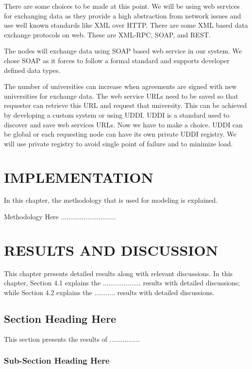 \documentclass[12pt,a4paper,oneside]{book} %
\begin{document}
There are some choices to be made at this point. We will be using web services for exchanging data as they provide a high abstraction from network issues and use well known standards like XML over HTTP. There are some XML based data exchange protocols on web. These are XML-RPC, SOAP, and REST.

The nodes will exchange data using SOAP based web service in our system.  We chose SOAP as it forces to follow a formal standard and supports developer defined data types.

The number of universities can increase when agreements are signed with new universities for exchange data. The web service URLs need to be saved so that requester can retrieve this URL and request that university. This can be achieved by developing a custom system or using UDDI. UDDI is a standard used to discover and save web services URLs. Now we have to make a choice. UDDI can be global or each requesting node can have its own private UDDI registry. We will use private registry to avoid single point of failure and to minimize load.


\chapter{IMPLEMENTATION}\label{c-implement}
In this chapter, the methodology that is used for modeling is explained.

Methodology Here .............................

\chapter{RESULTS AND DISCUSSION}\label{c-results}

This chapter presents detailed results along with relevant discussions. In this chapter, Section 4.1 explains the .................... results with detailed discussions; while Section 4.2 explains the ........... results with detailed discussions.

\section{Section Heading Here}

This section presents the results of ................

\subsection{Sub-Section Heading Here}
\end{document}
